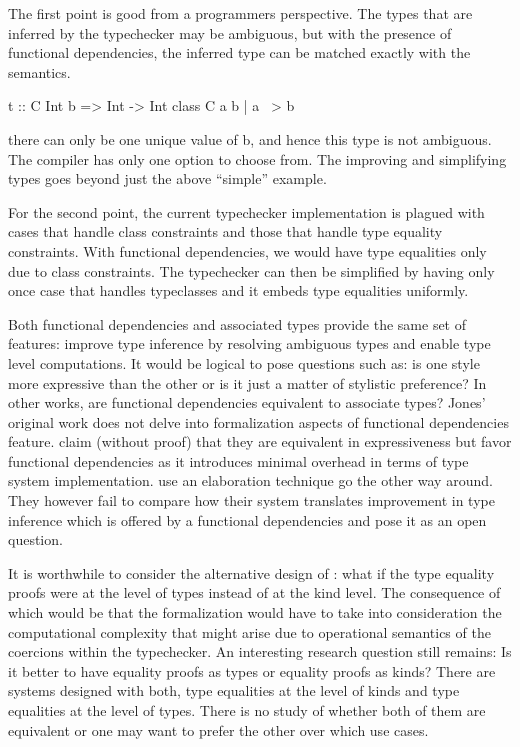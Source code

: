 \documentclass[screen,nonacm]{acmart}
\begin{document}
The first point is good from a programmers perspective. The types that
are inferred by the typechecker may be ambiguous, but with the presence of
functional dependencies, the inferred type can be matched exactly with
the semantics.

\begin{code}
  t :: C Int b => Int -> Int
  class C a b | a ~> b
\end{code}

there can only be one unique value of b, and hence this type is not
ambiguous. The compiler has only one option to choose from.
The improving and simplifying types goes beyond just the above
``simple'' example.

For the second point, the current typechecker implementation is
plagued with cases that handle class constraints and those that handle
type equality constraints. With functional dependencies, we would have
type equalities only due to class constraints. The typechecker can
then be simplified by having only once case that handles typeclasses
and it embeds type equalities uniformly. 

Both functional dependencies and associated types provide the same set
of features: improve type inference by resolving ambiguous types and
enable type level computations. It would be logical to pose
questions such as: is one style more expressive than the other or is
it just a matter of stylistic preference? In other works, are
functional dependencies equivalent to associate types? Jones' original
work does not delve into formalization aspects of functional
dependencies feature. \citet{jones_language_2008} claim (without
proof) that they  are equivalent in expressiveness but favor
functional dependencies as it introduces minimal overhead in terms of
type system implementation. \citet{karachalias_elaboration_2017} use
an elaboration technique go the other way around. They however fail to
compare how their system translates improvement in type inference
which is offered by a functional dependencies and pose it as an open
question.


It is worthwhile to consider the alternative design of \SFC: what if
the type equality proofs were at the level of types instead of at the kind
level. The consequence of which would be that the formalization would
have to take into consideration the computational complexity that
might arise due to operational semantics of the coercions within the
typechecker. An interesting research question still remains: Is it
better to have equality proofs as types or equality proofs as kinds?
There are systems designed with both, type equalities at the level of
kinds and type equalities at the level of types. There is no study of
whether both of them are equivalent or one may want to prefer the
other over which use cases.
\end{document}
